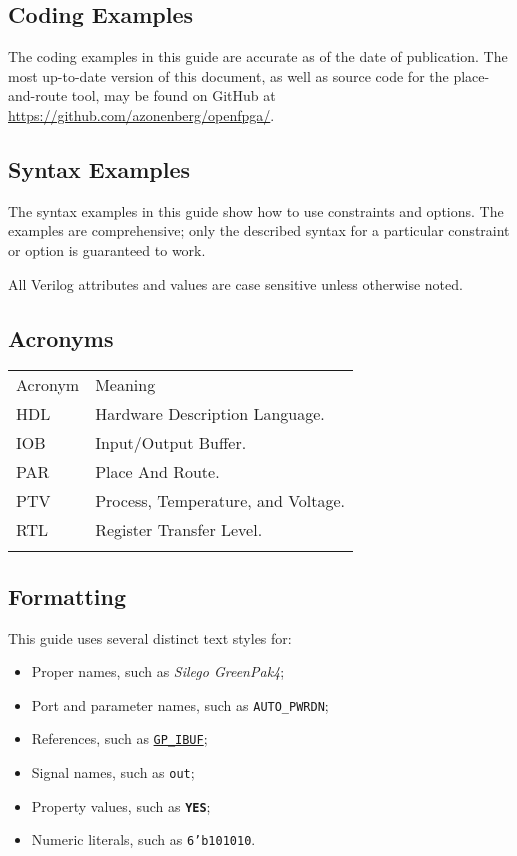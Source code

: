 \documentclass[11pt]{article}
\newcommand{\namestyle}[1]{\textit{#1}}
\newcommand{\tokenstyle}[1]{\texttt{#1}}
\newcommand{\wirestyle}[1]{\texttt{#1}}
\newcommand{\valuestyle}[1]{\texttt{#1}}
\newcommand{\strvaluestyle}[1]{\valuestyle{\textquotedbl#1\textquotedbl}}
\newcommand{\datastyle}[1]{\texttt{#1}}
\newcommand{\whenstyle}[1]{{\fontseries{sb}\selectfont#1}}
\newcommand{\tokenref}[2]{\hyperref[#2]{\tokenstyle{#1}}}
\newcommand{\thinhline}{\Xhline{1\arrayrulewidth}}
\newcommand{\thickhline}{\Xhline{2.5\arrayrulewidth}}
\begin{document}
\subsection{Coding Examples}
The coding examples in this guide are accurate as of the date of publication. The most up-to-date version of this
document, as well as source code for the place-and-route tool, may be found on GitHub at
\mbox{\url{https://github.com/azonenberg/openfpga/}}.

\subsection{Syntax Examples}
The syntax examples in this guide show how to use constraints and options. The examples are comprehensive; only the
described syntax for a particular constraint or option is guaranteed to work.

All Verilog attributes and values are case sensitive unless otherwise noted.

\subsection{Acronyms}

\begin{tabularx}{10cm}{lX}
\thinhline
\whenstyle{Acronym} & \whenstyle{Meaning} \\
\thickhline
HDL & Hardware Description Language. \\
\thinhline
IOB & Input/Output Buffer. \\
\thinhline
PAR & Place And Route. \\
\thinhline
PTV & Process, Temperature, and Voltage. \\
\thinhline
RTL & Register Transfer Level. \\
\thinhline
\end{tabularx}

\subsection{Formatting}
This guide uses several distinct text styles for:
\begin{itemize}
	\item Proper names, such as \namestyle{Silego GreenPak4};
	\item Port and parameter names, such as \tokenstyle{AUTO\_PWRDN};
	\item References, such as \tokenref{GP\_IBUF}{gp-ibuf};
	\item Signal names, such as \wirestyle{out};
	\item Property values, such as \strvaluestyle{\textbf{YES}};
	\item Numeric literals, such as \datastyle{6'b101010}.
\end{itemize}
\end{document}
